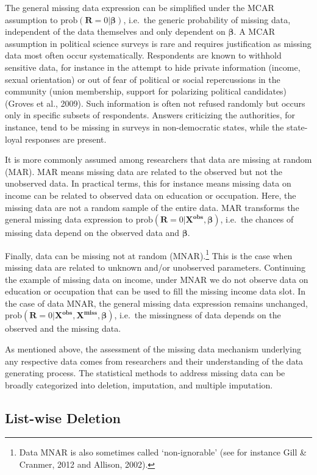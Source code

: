 \documentclass[12pt,econ]{sources/authesis}
\begin{document}
The general missing data expression can be simplified under the MCAR assumption to \(\text{prob}(\bm{R} = 0 | \bm{\beta})\), i.e.~the generic probability of missing data, independent of the data themselves and only dependent on \(\bm{\beta}\). A MCAR assumption in political science surveys is rare and requires justification as missing data most often occur systematically. Respondents are known to withhold sensitive data, for instance in the attempt to hide private information (income, sexual orientation) or out of fear of political or social repercussions in the community (union membership, support for polarizing political candidates) (Groves et al., 2009). Such information is often not refused randomly but occurs only in specific subsets of respondents. Answers criticizing the authorities, for instance, tend to be missing in surveys in non-democratic states, while the state-loyal responses are present.

It is more commonly assumed among researchers that data are missing at random (MAR). MAR means missing data are related to the observed but not the unobserved data. In practical terms, this for instance means missing data on income can be related to observed data on education or occupation. Here, the missing data are not a random sample of the entire data. MAR transforms the general missing data expression to \(\text{prob}(\bm{R} = 0 | \bm{X^{obs}}, \bm{\beta})\), i.e.~the chances of missing data depend on the observed data and \(\bm{\beta}\).

Finally, data can be missing not at random (MNAR).\footnote{Data MNAR is also sometimes called `non-ignorable' (see for instance Gill \& Cranmer, 2012 and Allison, 2002).} This is the case when missing data are related to unknown and/or unobserved parameters. Continuing the example of missing data on income, under MNAR we do not observe data on education or occupation that can be used to fill the missing income data slot. In the case of data MNAR, the general missing data expression remains unchanged, \(\text{prob}(\bm{R} = 0 | \bm{X^{obs}}, \bm{X^{miss}}, \bm{\beta})\), i.e.~the missingness of data depends on the observed and the missing data.

As mentioned above, the assessment of the missing data mechanism underlying any respective data comes from researchers and their understanding of the data generating process. The statistical methods to address missing data can be broadly categorized into deletion, imputation, and multiple imputation.

\hypertarget{ordmiss-theory-delete}{%
\subsection{List-wise Deletion}\label{ordmiss-theory-delete}}
\end{document}
